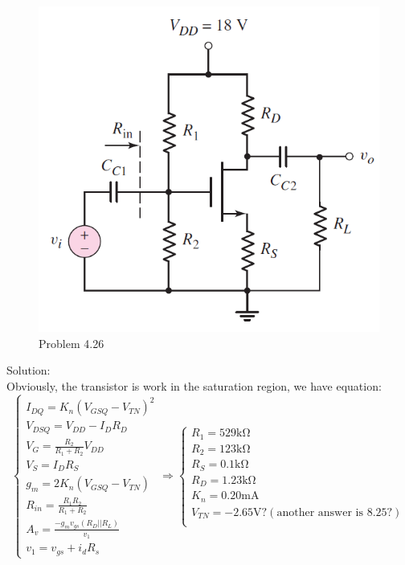 \documentclass[a4paper,11pt,UTF8]{article}
\begin{document}
\begin{figure}[H] 
	\centering 
	\includegraphics[scale=0.5]{MD4.26.png}
	\caption{Problem 4.26}
\end{figure}
\noindent Solution:\\
Obviously, the transistor is work in the saturation region, we have equation:\\
$$\begin{cases}\displaystyle
	I_{DQ}=K_n(V_{GSQ}-V_{TN})^2\\
	V_{DSQ}=V_{DD}-I_DR_D\\
	\displaystyle V_G=\frac{R_2}{R_1+R_2}V_{DD}\\
	V_S=I_DR_S\\
	g_m=2K_n(V_{GSQ}-V_{TN})\\
	\displaystyle R_{in}=\frac{R_1R_2}{R_1+R_2}\\
	\displaystyle A_v=\frac{-g_mv_{gs}(R_D||R_L)}{v_{1}}\\
	v_1=v_{gs}+i_dR_s
\end{cases}\Rightarrow
\begin{cases}
	R_1=529\mathrm{k\Omega}\\
	R_2=123\mathrm{k\Omega}\\
	R_S=0.1\mathrm{k\Omega}\\
	R_D=1.23\mathrm{k\Omega}\\
	K_n=0.20\mathrm{mA}\\
	V_{TN}=-2.65\mathrm{V}?(\text{another answer is }8.25?)\\
\end{cases}$$
\end{document}
